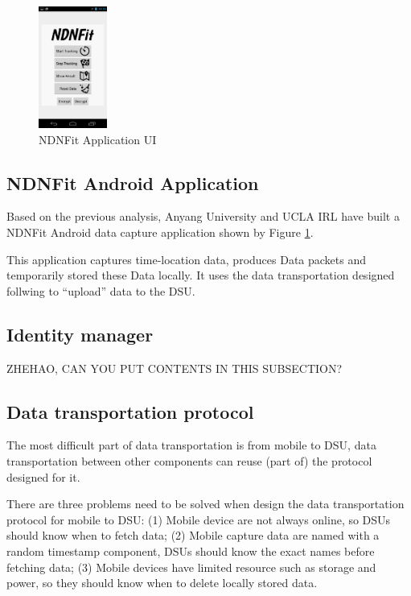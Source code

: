 \documentclass{article}
\begin{document}
\begin{figure}
	\begin{center}
		\includegraphics[width=0.2\textwidth]{NDNFit.png}
		\caption{NDNFit Application UI}
		\label{fig:ndnfit}
	\end{center}
\end{figure}

\subsection{NDNFit Android Application}
Based on the previous analysis, Anyang University and UCLA IRL have built a  NDNFit Android data capture application shown by Figure \ref{fig:ndnfit}.

This application captures time-location data, produces Data packets and temporarily stored these Data locally. It uses the data transportation designed follwing to ``upload'' data to the DSU.

\subsection{Identity manager}
ZHEHAO, CAN YOU PUT CONTENTS IN THIS SUBSECTION?

\subsection{Data transportation protocol}
The most difficult part of data transportation is from mobile to DSU, data transportation between other components can reuse (part of) the protocol designed for it. 

There are three problems need to be solved when design the  data transportation protocol for mobile to DSU: (1) Mobile device are not always online, so DSUs should know when to fetch data; (2) Mobile capture data are named with a random timestamp component, DSUs should know the exact names before fetching data; (3) Mobile devices have limited resource such as storage and power, so they should know when to delete locally stored data.
\end{document}
